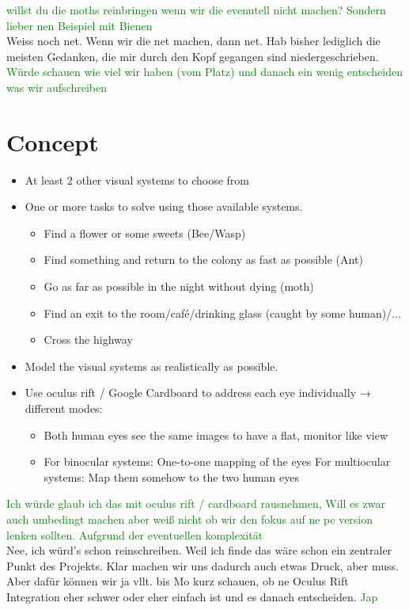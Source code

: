 \documentclass{acm_proc_article-sp}
\newcommand{\sebastian}[1]{\textcolor{Green}{#1}}
\newcommand{\stefan}[1]{\textcolor{BurntOrange}{#1}}
\begin{document}
\sebastian{willst du die moths reinbringen wenn wir die evenutell nicht machen?
Sondern lieber nen Beispiel mit Bienen}\\
\stefan{Weiss noch net. Wenn wir die net machen, dann net. Hab bisher lediglich
die meisten Gedanken, die mir durch den Kopf gegangen sind niedergeschrieben.}
\sebastian{Würde schauen wie viel wir haben (vom Platz) und danach ein wenig entscheiden was wir aufschreiben}



\section{Concept}
\begin{itemize}
\item At least 2 other visual systems to choose from
\item One or more tasks to solve using those available systems.
  \begin{itemize}
    \item Find a flower or some sweets (Bee/Wasp)
    \item Find something and return to the colony as fast as possible (Ant)
    \item Go as far as possible in the night without dying (moth)
    \item Find an exit to the room/café/drinking glass (caught by some human)/...
    \item Cross the highway
  \end{itemize}
\item Model the visual systems as realistically as possible.
\item Use oculus rift / Google Cardboard to address each eye individually
→ different modes:
  \begin{itemize}
  \item Both human eyes see the same images to have a flat, monitor like view
  \item For binocular systems: One-to-one mapping of the eyes
        For multiocular systems: Map them somehow to the two human eyes
  \end{itemize}
\end{itemize}

\sebastian{Ich würde glaub ich das mit oculus rift / cardboard rausnehmen,
Will es zwar auch umbedingt machen aber weiß nicht ob wir den fokus auf ne pc
version lenken sollten. Aufgrund der eventuellen komplexität}\\
\stefan{Nee, ich würd's schon reinschreiben. Weil ich finde das wäre schon ein
zentraler Punkt des Projekts. Klar machen wir uns dadurch auch etwas Druck,
aber muss. Aber dafür können wir ja vllt. bis Mo kurz schauen, ob ne Oculus Rift
Integration eher schwer oder eher einfach ist und es danach entscheiden.}
\sebastian{Jap}
\end{document}
